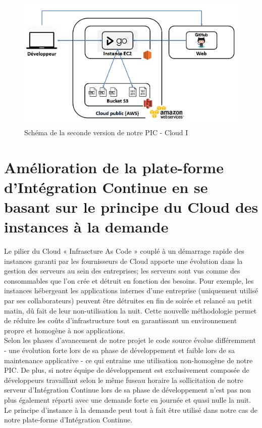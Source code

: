        \begin{figure}
          \begin{center}
            \includegraphics[scale=0.5]{images/PICv2.png}
          \end{center}
          \caption{Schéma de la seconde version de notre PIC - Cloud I}
          \label{PICv2}
        \end{figure}

      \section{Amélioration de la plate-forme d'Intégration Continue en se basant sur le principe du Cloud des instances à la demande}
      Le pilier du Cloud « Infrascture As Code » couplé à un démarrage rapide des instances garanti par les fournisseurs de Cloud apporte une évolution dans la gestion des serveurs au sein des entreprises; les serveurs sont vus comme des consommables que l'on crée et détruit en fonction des besoins. Pour exemple, les instances hébergeant les applications internes d'une entreprise (uniquement utilisé par ses collaborateurs) peuvent être détruites en fin de soirée et relancé au petit matin, dû fait de leur non-utilisation la nuit. Cette nouvelle méthodologie permet de réduire les coûts d'infrastructure tout en garantissant un environnement propre et homogène à nos applications.\\

      Selon les phases d'avancement de notre projet le code source évolue différemment - une évolution forte lors de sa phase de développement et faible lors de sa maintenance applicative - ce qui entraine une utilisation non-homogène de notre PIC. De plus, si notre équipe de développement est exclusivement composée de développeurs travaillant selon le même fuseau horaire la sollicitation de notre serveur d'Intégration Continue lors de sa phase de développement n'est pas non plus également réparti avec une demande forte en journée et quasi nulle la nuit. Le principe d'instance à la demande peut tout à fait être utilisé dans notre cas de notre plate-forme d'Intégration Continue.\\

